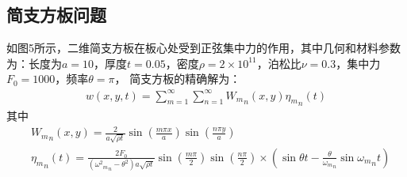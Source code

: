 \documentclass[11pt,a4paper]{article}
\begin{document}
\subsection{简支方板问题}
如图5所示，二维简支方板在板心处受到正弦集中力的作用，其中几何和材料参数为：长度为$a=10$，厚度$t=0.05$，密度$\rho=2\times 10^{11}$，泊松比$\nu=0.3$，集中力$F_0=1000$，频率$\theta=\pi$，
简支方板的精确解为：
\begin{equation}
\begin{split}
    w (x,y,t) = \mathop \sum \limits_{m = 1}^\infty  \mathop \sum \limits_{n = 1}^\infty  {W_m}_n(x,y){\eta _m}_n(t) 
\end{split}
\end{equation}
其中
\begin{equation}
\begin{split}
&{W_m}_n(x,y) = \frac{2}{{a\sqrt {\rho t} }}\sin (\frac{{m\pi x}}{a})\sin (\frac{{n\pi y}}{a})\\
&{\eta _m}_n(t) = \frac{{2{F_0}}}{{({\omega ^2}{{_m}_n} - {\theta ^2})a\sqrt {\rho t} }}\sin (\frac{{m\pi }}{2})\sin (\frac{{n\pi }}{2}) \times (\sin \theta t - \frac{\theta }{{{\omega _m}_n}}\sin {\omega _m}_nt)
\end{split}
\end{equation}
\end{document}
